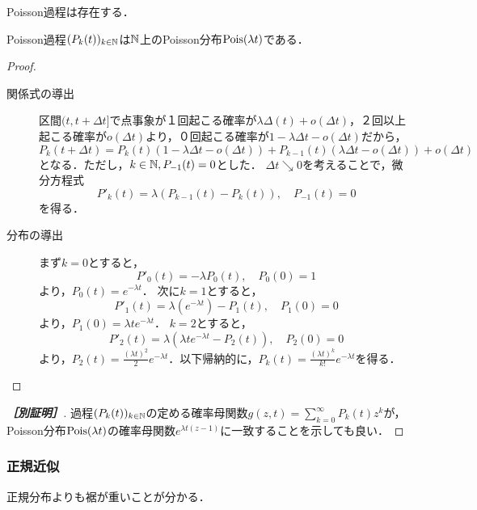 \documentclass[uplatex,dvipdfmx]{jsreport}
\begin{document}
\begin{lemma}
    Poisson過程は存在する．
\end{lemma}

\begin{proposition}
    Poisson過程$(P_k(t))_{k\in\mathbb{N}}$は$\mathbb{N}$上のPoisson分布$\mathrm{Pois}(\lambda t)$である．
\end{proposition}
\begin{proof}\mbox{}
    \begin{description}
        \item[関係式の導出] 区間$(t,t+\Delta t]$で点事象が１回起こる確率が$\lambda\Delta(t)+o(\Delta t)$，２回以上起こる確率が$o(\Delta t)$より，０回起こる確率が$1-\lambda\Delta t-o(\Delta t)$だから，
        \[P_k(t+\Delta t)=P_k(t)(1-\lambda\Delta t-o(\Delta t))+P_{k-1}(t)(\lambda\Delta t-o(\Delta t))+o(\Delta t)\]
        となる．ただし，$k\in\mathbb{N},P_{-1}(t)=0$とした．
        $\Delta t\searrow 0$を考えることで，微分方程式
        \[P'_k(t)=\lambda(P_{k-1}(t)-P_k(t)),\quad P_{-1}(t)=0\]
        を得る．
        \item[分布の導出]
        まず$k=0$とすると，
        \[P'_0(t)=-\lambda P_0(t),\quad P_0(0)=1\]
        より，$P_0(t)=e^{-\lambda t}$．
        次に$k=1$とすると，
        \[P'_1(t)=\lambda(e^{-\lambda t})-P_1(t),\quad P_1(0)=0\]
        より，$P_1(0)=\lambda te^{-\lambda t}$．
        $k=2$とすると，
        \[P'_2(t)=\lambda(\lambda te^{-\lambda t}-P_2(t)),\quad P_2(0)=0\]
        より，$P_2(t)=\frac{(\lambda t)^2}{2}e^{-\lambda t}$．以下帰納的に，$P_k(t)=\frac{(\lambda t)^k}{k!}e^{-\lambda t}$を得る．
    \end{description}
\end{proof}
\begin{proof}[\textbf{［別証明］}]
    過程$(P_k(t))_{k\in\mathbb{N}}$の定める確率母関数$g(z,t)=\sum^\infty_{k=0}P_k(t)z^k$が，Poisson分布$\mathrm{Pois}(\lambda t)$の確率母関数$e^{\lambda t(z-1)}$に一致することを示しても良い．
\end{proof}

\subsubsection{正規近似}

\begin{tcolorbox}[colframe=ForestGreen, colback=ForestGreen!10!white,breakable,colbacktitle=ForestGreen!40!white,coltitle=black,fonttitle=\bfseries\sffamily,
title=]
    正規分布よりも裾が重いことが分かる．
\end{tcolorbox}
\end{document}
